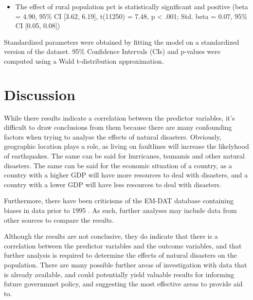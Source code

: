 \documentclass[10pt,a4paper,onecolumn]{article}
\providecommand{\tightlist}{%
  \setlength{\itemsep}{0pt}\setlength{\parskip}{0pt}}
\begin{document}
\begin{itemize}
\tightlist
\item
  The effect of rural population pct is statistically significant and positive (beta = 4.90, 95\% CI {[}3.62, 6.19{]}, t(11250) = 7.48, p \textless{} .001; Std. beta = 0.07, 95\% CI {[}0.05, 0.08{]})
\end{itemize}

Standardized parameters were obtained by fitting the model on a standardized version of the dataset. 95\% Confidence Intervals (CIs) and p-values were computed using a Wald t-distribution approximation.

\hypertarget{discussion}{%
\section{Discussion}\label{discussion}}

While there results indicate a correlation between the predictor variables, it's difficult to draw conclusions from them because there are many confounding factors when trying to analyse the effects of natural disasters. Obviously, geographic location plays a role, as living on faultlines will increase the likelyhood of earthquakes. The same can be said for hurricanes, tsunamis and other natural disasters. The same can be said for the economic situation of a country, as a country with a higher GDP will have more resources to deal with disasters, and a country with a lower GDP will have less resources to deal with disasters.

Furthermore, there have been criticisms of the EM-DAT database containing biases in data prior to 1995 \autocite{panwarDisasterDamageRecords2020}. As such, further analyses may include data from other sources to compare the results.

Although the results are not conclusive, they do indicate that there is a correlation between the predictor variables and the outcome variables, and that further analysis is required to determine the effects of natural disasters on the population.
There are many possible further areas of investigation with data that is already available, and could potentially yield valuable results for informing future governmnet policy, and suggesting the most effective areas to provide aid to.
\balance
\clearpage


\printbibliography[title=References]
\end{document}
